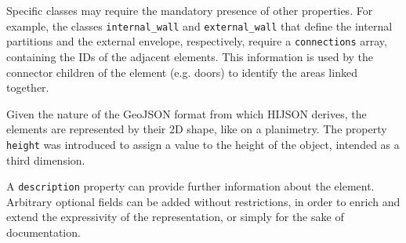 Specific classes may require the mandatory presence of other properties. For
example, the classes {\tt internal\_wall} and {\tt external\_wall} that
define the internal partitions and the external envelope, respectively, require a {\tt connections}
array, containing the IDs of the adjacent elements. This information is used
by the connector children of the element (e.g. doors) to identify the
areas linked together.

Given the nature of the GeoJSON format from which HIJSON derives, the elements
are represented by their 2D shape, like on a planimetry. The property {\tt
height} was introduced to assign a value to the height of the object, intended
as a third dimension.

A {\tt description} property can provide further information about
the element.
Arbitrary optional fields can be added without restrictions, in order to
enrich and extend the expressivity of the representation, or simply for the sake of 
documentation.
